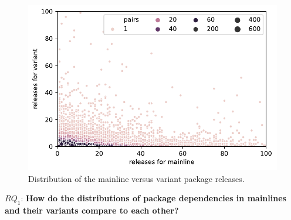 \begin{figure}[htbp]
\vspace{-.3cm}
   \centering
    \includegraphics[scale=0.5]{figures/benevolj_releases.pdf}
    \caption{Distribution of the mainline versus variant package releases.}
    \label{fig:releases}
\end{figure}


$RQ_1$: \textbf{How do the distributions of package dependencies in mainlines and their variants compare to each other?}

